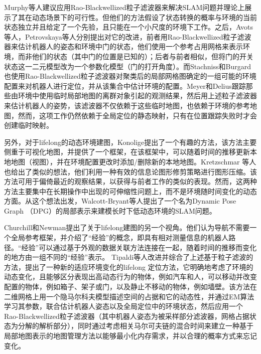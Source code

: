 Murphy\cite{Murphy1999Bayesian}等人建议应用Rao-Blackwellized粒子滤波器来解决SLAM问题并理论上展示了其在动态场景下的可行性。但他们的方法假设了状态转换的概率与环境的当前状态独立并且给定了一个先验，且只能在一个小尺度的环境下工作。之后，Avots等人\cite{Avots2002A}，Petrovskaya\cite{Petrovskaya2007Probabilistic}等人分别提出对它的改进，前者用Rao-Blackwellized粒子滤波器来估计机器人的姿态和环境中门的状态，他们使用一个参考占用网格来表示环境，而非他们的状态（其中门的位置是已知的）；后者与前者相似，但将门的开关状态这一二元模型改为一个参数化模型（门的打开角度）。而Stachniss和Burgard\cite{Stachniss2005Mobile}也使用Rao-Blackwellized粒子滤波器对聚类后的局部网格图确定的一组可能的环境配置来对机器人进行定位，并从该集合中估计环境的配置。Meyer和Delius\cite{Meyer2010Temporary}跟踪那些由环境中使用临时局部地图的离群对象引起的观测结果，然后用上述粒子滤波器来估计机器人的姿势，该滤波器不仅依赖于这些临时地图，也依赖于环境的参考地图，然而，这项工作仍然依赖于全局定位的静态映射，只有在位置跟踪失败时才会创建临时映射。

另外，对于lifelong的动态环境建图，Konolige\cite{Konolige2009Towards}提出了一个有趣的方法，该方法主要侧重于可视化地图，并提供了一个框架，在该框架中，可以随着时间的推移更新本地地图（视图），并在环境配置更改时添加/删除新的本地地图。Kretzschmar\cite{Kretzschmar2012Information} 等人也给出了类似的想法，他们利用一种有效的信息论图形修剪策略进行图形压缩。该方法可用于偏倚最近的观察结果，以获得与前者工作的类似的表现。然而，这两种方法主要集中在长期操作中出现的可伸缩性问题上，而不是环境随时间变化的动态方面。从这个想法出发，Walcott-Bryant\cite{Walcott2012Dynamic}等人提出了一个名为Dynamic Pose Graph （DPG）的局部表示来建模长时下低动态环境的SLAM问题。

Churchill和Newman\cite{Churchill2012Practice}提出了关于lifelong建图的另一个视角。他们认为导航不需要一个全局参考框架，并介绍了“经验”的概念，即具有相对测量信息的机器人路径。“经验”可以通过基于外观的数据关联方法连接在一起，随着时间的推移而变化的地方由一组不同的“经验”表示。
Tipaldi等人\cite{Tipaldi2013Lifelong}改进并综合了上述基于粒子滤波的方法，提出了一种新的适应环境变化的lifelong 定位方法，它明确地考虑了环境的动态变化，且能够区分表现出高动态行为的物体，例如汽车和人，可以移动并改变配置的物体，例如箱子、架子或门，以及静止不移动的物体，例如墙壁。该方法在二维网格上用一个隐马尔科夫模型描述空间的占据和它的动态性，并通过EM算法学习其参数，联合估计机器人姿态以及全局定位中的环境状态，然后应用一个Rao-Blackwellized粒子滤波器（其中机器人姿态为被采样部分滤波器，网格占据状态为分解的解析部分），同时通过考虑相关马尔可夫链的混合时间来建立一种基于局部地图表示的地图管理方法以能够最小化内存需求，并以合理的概率方式来忘记变化。

